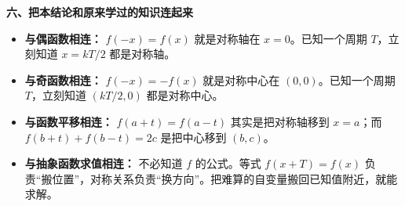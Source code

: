 \clearpage
\begin{explanationbox}
\textbf{\textcolor{CExplanation}{六、把本结论和原来学过的知识连起来}}


\begin{itemize}[leftmargin=*,itemsep=0.4em]
\item \textbf{与偶函数相连：} $f(-x)=f(x)$ 就是对称轴在 $x=0$。已知一个周期 $T$，立刻知道 $x=kT/2$ 都是对称轴。
\item \textbf{与奇函数相连：} $f(-x)=-f(x)$ 就是对称中心在 $(0,0)$。已知一个周期 $T$，立刻知道 $(kT/2,0)$ 都是对称中心。
\item \textbf{与函数平移相连：} $f(a+t)=f(a-t)$ 其实是把对称轴移到 $x=a$；而 $f(b+t)+f(b-t)=2c$ 是把中心移到 $(b,c)$。
\item \textbf{与抽象函数求值相连：} 不必知道 $f$ 的公式。等式 $f(x+T)=f(x)$ 负责“搬位置”，对称关系负责“换方向”。把难算的自变量搬回已知值附近，就能求解。
\end{itemize}
\end{explanationbox}
